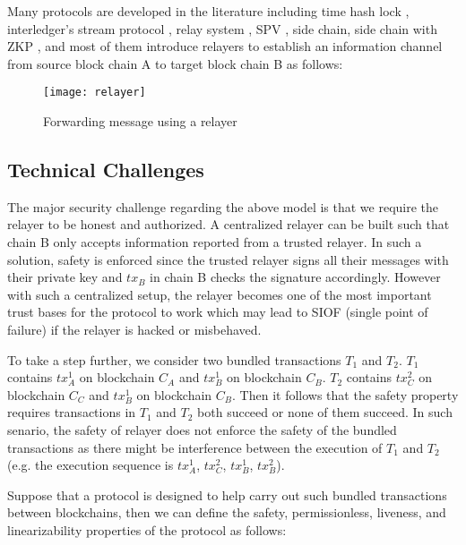 Many protocols are developed in the literature including time hash lock \cite{poon2016bitcoin}, interledger’s stream protocol \cite{zhang2021enabling}, relay system \cite{lys2021r}, SPV \cite{nakamoto2008bitcoin}, side chain\cite{singh2020sidechain,deng2018sidechain}, side chain with ZKP \cite{sidechainzkp}, and most of them introduce relayers \cite{sun2020collaborative-relay, warren20170x-relay} to establish an information channel from source block chain A to target block chain B as follows:
\begin{figure}[!ht]
\texttt{[image: relayer]}
\caption{Forwarding message using a relayer}
\label{relayer-connection}
\end{figure}

\subsection{Technical Challenges}
The major security challenge regarding the above model is that we require the relayer to be honest and authorized. A centralized relayer can be built such that chain B only accepts information reported from a trusted relayer. In such a solution, safety is enforced since the trusted relayer signs all their messages with their private key and $tx_B$ in chain B checks the signature accordingly. However with such a centralized setup, the relayer becomes one of the most important trust bases for the protocol to work which may lead to SIOF (single point of failure) if the relayer is hacked or misbehaved.


To take a step further, we consider two bundled transactions $T_1$ and $T_2$. $T_1$ contains $tx_A^1$ on blockchain $C_A$ and $tx_B^1$ on blockchain $C_B$. $T_2$ contains $tx^2_C$ on blockchain $C_C$ and $tx_B^1$ on blockchain $C_B$. Then it follows that the safety property requires transactions in $T_1$ and $T_2$ both succeed or none of them succeed. In such senario, the safety of relayer does not enforce the safety of the bundled transactions as there might be interference between the execution of $T_1$ and $T_2$ (e.g. the execution sequence is $tx_A^1$, $tx_C^2$, $tx_B^1$, $tx_B^2$). 

Suppose that a protocol is designed to help carry out such bundled transactions between blockchains, then we can define the safety, permissionless, liveness, and linearizability properties of the protocol as follows:

